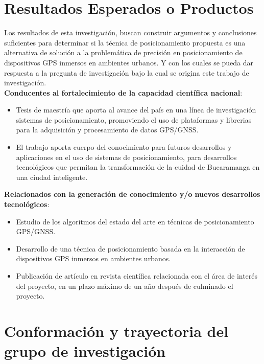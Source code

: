 \section{Resultados Esperados o Productos}
\label{sec:Resultados Esperados o Productos}

Los resultados de esta investigación, buscan construir argumentos y conclusiones suficientes para determinar si la técnica de posicionamiento propuesta es una alternativa de solución a la problemática de precisión en posicionamiento de dispositivos GPS inmersos en ambientes urbanos. Y con los cuales se pueda dar respuesta a la pregunta de investigación bajo la cual se origina %
este trabajo de investigación.\\

\textbf{Conducentes al fortalecimiento de la capacidad científica nacional}:

\begin{itemize}
	\item Tesis de maestría que aporta al avance del país en una línea de investigación sistemas de posicionamiento, promoviendo el uso de plataformas y librerias para la adquisición y procesamiento de datos GPS/GNSS.
	\item El trabajo aporta cuerpo del conocimiento para futuros desarrollos y aplicaciones en el uso de sistemas de posicionamiento, para desarrollos tecnológicos que permitan la transformación de la cuidad de Bucaramanga en una ciudad inteligente.
\end{itemize}


\textbf{Relacionados con la generación de conocimiento y/o nuevos desarrollos tecnológicos}:


\begin{itemize}
	\item Estudio de los algoritmos del estado del arte en técnicas de posicionamiento GPS/GNSS.
	\item Desarrollo de una técnica de posicionamiento basada en la interacción de dispositivos GPS inmersos en ambientes urbanos.
	\item Publicación de artículo en revista científica relacionada con el área de interés del proyecto, en un plazo máximo de un año después de culminado el proyecto.
\end{itemize}



\section{Conformación y trayectoria del grupo de investigación}
\label{sec:Trajectoria SC3}

